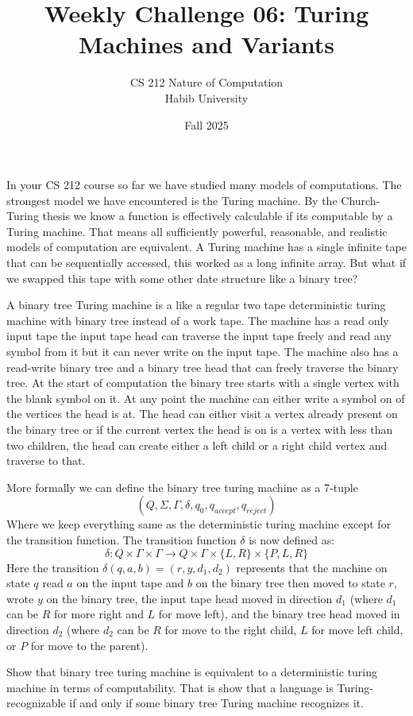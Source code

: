 \documentclass[a4paper]{exam}
\title{Weekly Challenge 06: Turing Machines and Variants}
\author{CS 212 Nature of Computation\\Habib University}
\date{Fall 2025}
\begin{document}
\maketitle

\begin{questions}
    In your CS 212 course so far we have studied many models of computations. The strongest model we have encountered is the Turing machine. By the Church-Turing thesis we know a function is effectively calculable if its computable by a Turing machine. That means all sufficiently powerful, reasonable, and realistic models of computation are equivalent. A Turing machine has a single infinite tape that can be sequentially accessed, this worked as a long infinite array. But what if we swapped this tape with some other date structure like a binary tree? 

    A binary tree Turing machine is a like a regular two tape deterministic turing machine with binary tree instead of a work tape. The machine has a read only input tape the input tape head can traverse the input tape freely and read any symbol from it but it can never write on the input tape. The machine also has a read-write binary tree and a binary tree head that can freely traverse the binary tree. At the start of computation the binary tree starts with a single vertex with the blank symbol on it. At any point the machine can either write a symbol on of the vertices the head is at. The head can either visit a vertex already present on the binary tree or if the current vertex the head is on is a vertex with less than two children, the head can create either a left child or a right child vertex and traverse to that.  

    More formally we can define the binary tree turing machine as a 7-tuple 
    $$(Q, \Sigma, \Gamma, \delta, q_0, q_{accept}, q_{reject})$$ 
    Where we keep everything same as the deterministic turing machine except for the transition function. The transition function $\delta$ is now defined as: 
    $$\delta: Q \times \Gamma \times \Gamma \to Q \times \Gamma \times\{L,R\} \times \{P, L, R\}$$
    Here the transition $\delta(q,a,b) = (r,y,d_1,d_2)$ represents that the machine on state $q$ read $a$ on the input tape and $b$ on the binary tree then moved to state $r$, wrote $y$ on the binary tree, the input tape head moved in direction $d_1$ (where $d_1$ can be $R$ for more right and $L$ for move left), and the binary tree head moved in direction $d_2$ (where $d_2$ can be $R$ for move to the right child, $L$ for move left child, or $P$ for move to the parent).

   Show that binary tree turing machine is equivalent to a deterministic turing machine in terms of computability. That is show that a language is Turing-recognizable if and only if some binary tree Turing machine recognizes it.
 
    \begin{solution}
    \end{solution}
    
    

    
  
\end{questions}
\end{document}
